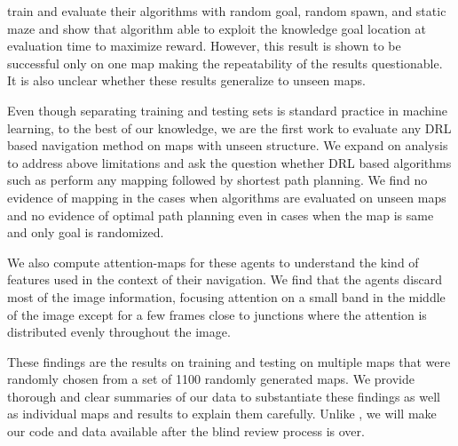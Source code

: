 \cite{MiPaViICLR2017} train and evaluate their algorithms with random goal, random spawn, and static maze and show that algorithm able to exploit the knowledge goal location at evaluation time to maximize reward.
However, this result is shown to be successful only on one map making the repeatability of the results questionable.
It is also unclear whether these results generalize to unseen maps.

Even though separating training and testing sets is standard practice in machine learning, to the best of our knowledge, we are the first work to evaluate any DRL based navigation method on maps with unseen structure.
We expand on \cite{MiPaViICLR2017} analysis to address above limitations and ask the question whether DRL based algorithms such as \NavAiiiCDiDiiL{} perform any mapping followed by shortest path planning.
We find no evidence of mapping in the cases when algorithms are evaluated on unseen maps and no evidence of optimal path planning even in cases when the map is same and only goal is randomized.

We also compute attention-maps for these agents to understand the kind of features used in the context of their navigation.
We find that the agents discard most of the image information, focusing attention on a small band in the middle of the image except for a few frames close to junctions where the attention is distributed evenly throughout the image.

These findings are the results on training and testing on multiple maps that were randomly chosen from a set of 1100 randomly generated maps.
We provide thorough and clear summaries of our data to substantiate these findings as well as individual maps and results to explain them carefully.
Unlike \cite{MiPaViICLR2017}, we will make our code and data available after the blind review process is over.




